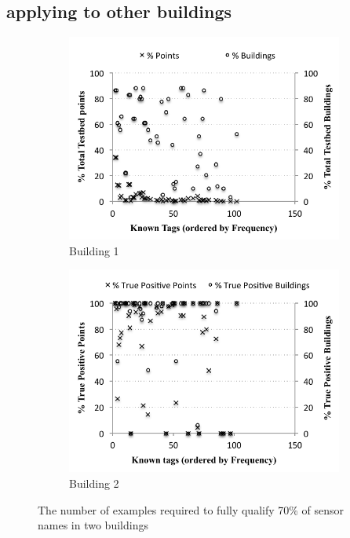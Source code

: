 \subsection{applying to other buildings}

\begin{figure}[h!]
\centering
	\begin{subfigure}{0.48\textwidth}
                \centering
		\includegraphics[width=\textwidth]{./figs/campusWideStats.pdf}
                \caption{Building 1}
                \label{fig:active-learning-soda}
	\end{subfigure}
	\begin{subfigure}{0.48\textwidth}
                \centering
		\includegraphics[width=\textwidth]{./figs/recallCampusWide.pdf}
                \caption{Building 2}
                \label{fig:active-learning-sdh}
	\end{subfigure}
\caption{The number of examples required to fully qualify 70\% of sensor names in two buildings}
\label{fig:active-learning}
\end{figure}






